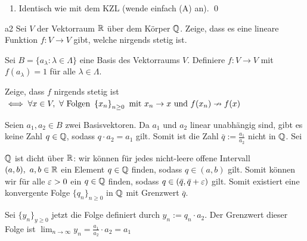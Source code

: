 \documentclass[12pt]{article}
\begin{document}
\begin{enumerate}[label=(\alph*)]
\begin{enumerate}[label=(\Alph*)]
    Wenn $U \in P$, dann ist $U$ linear unabhängig. Das heisst, dass jede endliche Teilmenge von $U$ auch linear unabhängig ist. Also ist jede endliche Teilmenge von $U$ auch in $P$. 
    Wenn jede endliche Teilmenge von $U$ in $P$ ist, dann ist jede endliche Teilmenge von $U$ linear unabhängig. Dann ist $U$ auch linear unabhängig. Also ist $U \in P$.

    Somit hat $P$ endlichen Charakter. Nach dem Teichmüller Prinzip hat also $P$ ein maximales Element $B$ nach $\subseteq$. Nach dem gleichen Prinzip wie in der Teilaufgabe (a) ist $B$ eine Basis von $V$. \qed

    \item Identisch wie mit dem KZL (wende einfach (A) an). \qed
\end{enumerate}

\end{enumerate}

\newpage

\begin{problem}[Aufgabe]{}{a2}
Sei $V$ der Vektorraum $\mathbb{R}$ über dem Körper $\mathbb{Q}$. Zeige, dass es eine lineare Funktion $f: V \rightarrow V$ gibt, welche nirgends stetig ist.
\end{problem}

Sei $B = \{a_\lambda : \lambda \in \Lambda\}$ eine Basis des Vektorraums $V$. Definiere $f: V \rightarrow V$ mit $f(a_\lambda) = 1$ für alle $\lambda \in \Lambda$.

Zeige, dass $f$ nirgends stetig ist  $\iff \forall x \in V, \ \forall \text{ Folgen } \left\{x_n\right\}_{n \geq 0} \text{ mit } x_n \rightarrow x \\ \text{ und } f(x_n) \nrightarrow f(x)$

Seien $a_1, a_2 \in B$ zwei Basisvektoren. Da $a_1$ und $a_2$ linear unabhängig sind, gibt es keine Zahl $q \in \mathbb{Q}$, sodass $q \cdot a_2 = a_1$ gilt. Somit ist die Zahl $\bar{q} := \frac{a_1}{a_2}$ nicht in $\mathbb{Q}$. Sei 

$\mathbb{Q}$ ist dicht über $\mathbb{R}$: wir können für jedes nicht-leere offene Intervall $(a, b), \ a, b \in \mathbb{R}$ ein Element $q \in \mathbb{Q}$ finden, sodass $q \in (a, b)$ gilt. Somit können wir für alle $\varepsilon > 0$ ein $q \in \mathbb{Q}$ finden, sodass $q \in (\bar{q}, \bar{q} + \varepsilon)$ gilt. Somit existiert eine konvergente Folge $\{q_n\}_{n \geq 0}$ in $\mathbb{Q}$ mit Grenzwert $\bar{q}$.

Sei $\{y_n\}_{y \geq 0}$ jetzt die Folge definiert durch $y_n := q_n \cdot a_2$. Der Grenzwert dieser Folge ist $\lim_{n \rightarrow \infty} y_n = \frac{a_1}{a_2} \cdot a_2 = a_1$
\end{document}
